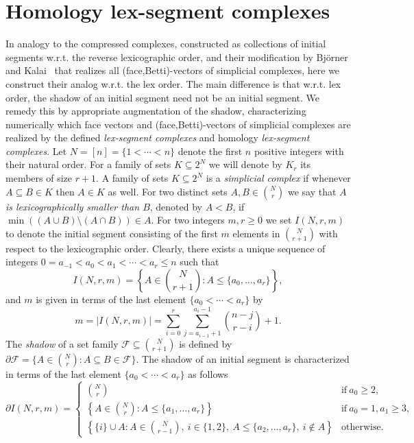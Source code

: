 \documentclass[11pt]{article}
\numberwithin{claimcounter}{theorem}
\theoremstyle{remark}
\theoremstyle{definition}
\numberwithin{theorem}{section}
\begin{document}
\section{Homology lex-segment complexes}\label{apx:lex}
In analogy to the compressed complexes, constructed as collections of initial segments w.r.t. the reverse lexicographic order, and their modification by Bj\"{o}rner and Kalai~\cite{Bjorner-Kalai-ACTA} that realizes all (face,Betti)-vectors of simplicial complexes, here we construct their analog w.r.t. the lex order. The main difference is that w.r.t. lex order, the shadow of an initial segment need not be an initial segment. We remedy this by appropriate augmentation of the shadow, characterizing numerically which face vectors and (face,Betti)-vectors of simplicial complexes are realized  
by the defined \emph{lex-segment complexes} and homology \emph{lex-segment complexes}.
%
%
Let $N=[n]=\{1 < \cdots < n\}$ denote the first $n$ positive integers with their natural order.
For a family of sets $K \subseteq 2^N$ we will denote by $K_r$ its members of size $r+1$.
A family of sets $K \subseteq 2^N$ is a \emph{simplicial complex} if whenever $A\subseteq B\in K$ then $A\in K$ as well.
%
For two distinct sets $A,B\in \binom{N}{r}$ we say that \emph{$A$ is lexicographically smaller than $B$}, denoted by $A<B$, if $\min ((A\cup B)\setminus (A\cap B)) \in A$.
For two integers $m,r\geq 0$ we set $I(N,r,m)$ to denote the initial segment consisting of the first $m$ elements in $\binom{N}{r+1}$ with respect to the lexicographic order. 
Clearly, there exists a unique sequence of integers $0=a_{-1}<a_0< a_1< \cdots < a_r\leq n$ such that $$I(N,r,m) = \left \{A \in \binom{N}{r+1} \colon A \leq \{a_0,\dots,a_r \} \right \},$$
%
and $m$
is given in terms of the last element $\{a_0<\cdots<a_r\}$ by $$m=|I(N,r,m)| = \sum_{i=0}^r \sum_{j=a_{i-1}+1}^{a_i-1} \binom{n-j}{r-i} + 1.$$
%
The \emph{shadow} of a set family $\mathcal{F} \subseteq \binom{N}{r+1}$ is defined by $\partial \mathcal{F} = \{A\in \binom{N}{r} \colon A\subseteq B \in \mathcal{F}\}$.
The shadow of an initial segment is characterized in terms of the last element $\{a_0<\cdots <a_r\}$ as follows
$$\partial I(N,r,m) = 
\begin{cases} 
    \binom{N}{r} & \text{if}~a_0\geq 2, \\
    \left \{A \in \binom{N}{r} \colon A \leq \{a_1,\dots, a_r\} \right \} & \text{if}~a_0=1, a_1\geq 3,\\
    \left \{ \{i\} \cup A \colon A \in \binom{N}{r-1},~i\in \{1,2\},~A\leq \{a_2,\dots, a_r\},~i\notin A  \right \} & \text{otherwise.}
\end{cases}$$
\end{document}
